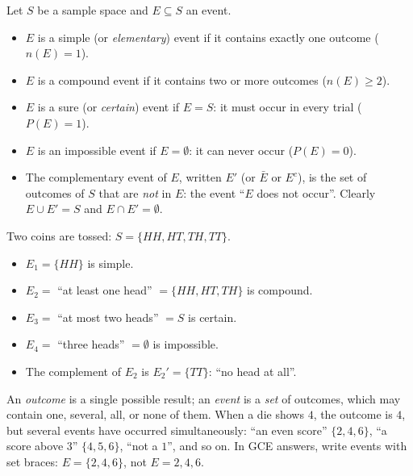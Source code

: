 \documentclass[11pt]{article}
\newcommand{\cle}[1]{{\popxbold\color{popdark}#1}}
\begin{document}
\begin{definition}
Let $S$ be a sample space and $E \subseteq S$ an event.
\begin{itemize}
\item $E$ is a \cle{simple} (or \emph{elementary}) event if it contains exactly one outcome ($n(E)=1$).
\item $E$ is a \cle{compound} event if it contains two or more outcomes ($n(E) \ge 2$).
\item $E$ is a \cle{sure} (or \emph{certain}) event if $E = S$: it must occur in every trial ($P(E)=1$).
\item $E$ is an \cle{impossible} event if $E = \emptyset$: it can never occur ($P(E)=0$).
\item The \cle{complementary event} of $E$, written $E'$ (or $\bar{E}$ or $E^c$), is the set of outcomes of $S$ that are \emph{not} in $E$: the event ``$E$ does not occur''. Clearly $E \cup E' = S$ and $E \cap E' = \emptyset$.
\end{itemize}
\end{definition}

\begin{exemplebox}
Two coins are tossed: $S = \{HH, HT, TH, TT\}$.
\begin{itemize}
\item $E_1 = \{HH\}$ is simple.
\item $E_2 = $ ``at least one head'' $= \{HH, HT, TH\}$ is compound.
\item $E_3 = $ ``at most two heads'' $= S$ is certain.
\item $E_4 = $ ``three heads'' $= \emptyset$ is impossible.
\item The complement of $E_2$ is $E_2' = \{TT\}$: ``no head at all''.
\end{itemize}
\end{exemplebox}

\begin{attention}
An \emph{outcome} is a single possible result; an \emph{event} is a \emph{set} of outcomes, which may contain one, several, all, or none of them. When a die shows $4$, the outcome is $4$, but several events have occurred simultaneously: ``an even score'' $\{2,4,6\}$, ``a score above $3$'' $\{4,5,6\}$, ``not a $1$'', and so on. In GCE answers, write events with set braces: $E = \{2,4,6\}$, not $E = 2,4,6$.
\end{attention}
\end{document}
